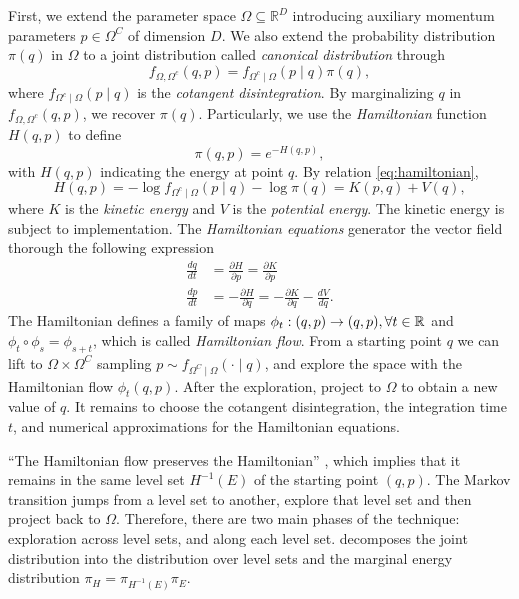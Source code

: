 First, we extend the parameter space $\Omega \subseteq \mathbb{R}^D$ 
introducing auxiliary momentum parameters $p \in \Omega^C$ of dimension $D$. We also
extend the probability distribution $\pi(q)$ in $\Omega$ to a joint
distribution called {\em canonical distribution} through 
$$f_{\Omega, \Omega^c}(q, p) = f_{\Omega^c \mid \Omega}(p
\mid q) \pi(q),$$
where $f_{\Omega^c \mid \Omega}(p
\mid q)$ is the {\em cotangent disintegration}. By marginalizing $q$ 
in $f_{\Omega, \Omega^c}(q, p)$, we recover $\pi(q)$. 
Particularly, we use the {\em Hamiltonian} function $H(q,p)$ to define
\begin{equation}
  \label{eq:hamiltonian}
  \pi(q,p) = e^{-H(q,p)}, 
\end{equation}
with $H(q,p)$ indicating the energy at point $q$. By relation
\eqref{eq:hamiltonian}, 
$$
H(q, p) = -\log f_{\Omega^c \mid \Omega}(p \mid q) - \log \pi(q) = K(p,q) + V(q), 
$$
where $K$ is the {\em kinetic energy} and $V$ is the {\em potential energy}.
The kinetic energy is subject to implementation. The {\em Hamiltonian
equations}
generator the vector field thorough the following expression
\begin{align*}
  \frac{dq}{dt} &= \frac{\partial H}{\partial p} = \frac{\partial K}{\partial p} \\
  \frac{dp}{dt} &= -\frac{\partial H}{\partial q} = -\frac{\partial K}{\partial q} - \frac{d V}{d q}.
\end{align*}
The Hamiltonian defines a family of maps $\phi_t : (q,p) \to (q,p), \forall t
\in \mathbb{R}$ and $\phi_t \circ \phi_s = \phi_{s+t}$, which is called {\em
Hamiltonian flow}. From a starting point $q$ we can lift to $\Omega \times
\Omega^C$ sampling $p \sim f_{\Omega^C \mid \Omega}(\cdot \mid q)$, and
explore the space with the Hamiltonian flow $\phi_t(q,p)$. After the
exploration, project to $\Omega$ to obtain a new value of $q$. It remains to
choose the cotangent disintegration, the integration time $t$, and numerical
approximations for the Hamiltonian equations.

``The Hamiltonian flow preserves the Hamiltonian'' \cite{metacademy2021}, which
implies that it remains in the same level set $H^{-1}(E)$ of the starting
point $(q,p)$. The Markov transition jumps from a level set to another,
explore that level set and then project back to $\Omega$. Therefore, 
there are two main phases of the technique: exploration across level sets, and
along each level set. \textcite[p. 6]{betancourt2016diagnosing} decomposes the
joint distribution into the distribution over level sets and the marginal
energy distribution $\pi_H = \pi_{H^{-1}(E)}\pi_{E}$.

